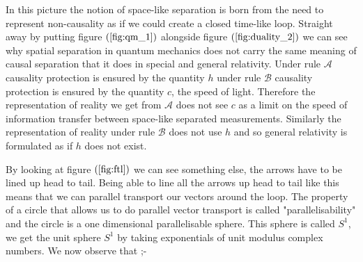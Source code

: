 \documentclass[
   ,final            %
  ]
  {aipproc}
\begin{document}
\par
In this picture the notion of space-like separation is born from the need to represent non-causality as if we could create a closed time-like loop.
Straight away by putting figure $(\ref{fig:qm_1})$ alongside figure $(\ref{fig:duality_2})$ we can see why spatial separation in quantum mechanics %
does not carry the same meaning of causal separation that it does in special and general relativity. Under rule $\mathcal{A}$ causality protection is %
ensured by the quantity $h$ under rule $\mathcal{B}$ causality protection is ensured by the quantity $c$, the speed of light. Therefore the %
representation of reality we get from $\mathcal{A}$ does not see $c$ as a limit on the speed of information transfer between space-like separated %
measurements. Similarly the representation of reality under rule $\mathcal{B}$ does not use $h$ and so general relativity is formulated as if $h$ does %
not exist.
\par
By looking at figure $(\ref{fig:ftl})$ we can see something else, the arrows have to be lined up head to tail. Being able to line all the arrows up %
head to tail like this means that we can parallel transport our vectors around the loop. The property of a circle that allows us to do parallel vector %
transport is called "parallelisability" and the circle is a one dimensional parallelisable sphere. This sphere is called $S^1$, we get the unit sphere %
$S^1$ by taking  exponentials of unit modulus complex numbers. We now observe that ;-
\end{document}
